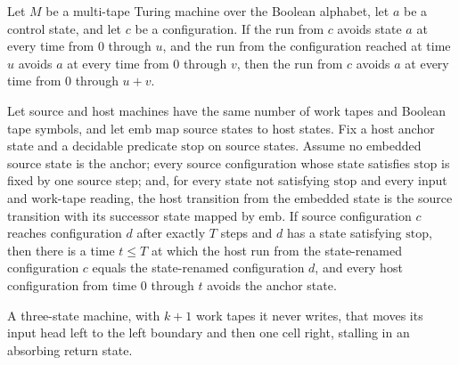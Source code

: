 \begin{lemma}
\label{Turing.FinTM.splitSafe_add}
\leanok
{}
Let $M$ be a multi-tape Turing machine over the Boolean alphabet, let $a$ be a control
state, and let $c$ be a configuration. If the run from $c$ avoids state $a$ at every
time from $0$ through $u$, and the run from the configuration reached at time $u$ avoids
$a$ at every time from $0$ through $v$, then the run from $c$ avoids $a$ at every time
from $0$ through $u+v$.
\end{lemma}

\begin{lemma}
\label{Turing.FinTM.splitEmbed_cut}
\leanok
{}
Let source and host machines have the same number of work tapes and Boolean tape
symbols, and let $\mathrm{emb}$ map source states to host states. Fix a host anchor
state and a decidable predicate $\mathrm{stop}$ on source states. Assume no embedded
source state is the anchor; every source configuration whose state satisfies
$\mathrm{stop}$ is fixed by one source step; and, for every state not satisfying
$\mathrm{stop}$ and every input and work-tape reading, the host transition from the
embedded state is the source transition with its successor state mapped by
$\mathrm{emb}$. If source configuration $c$ reaches configuration $d$ after exactly $T$
steps and $d$ has a state satisfying $\mathrm{stop}$, then there is a time $t\le T$ at
which the host run from the state-renamed configuration $c$ equals the state-renamed
configuration $d$, and every host configuration from time $0$ through $t$ avoids the
anchor state.
\end{lemma}

\begin{definition}
\label{Turing.FinTM.splitRewindTM}
\leanok
{}
A three-state machine, with $k+1$ work tapes it never writes, that moves its
input head left to the left boundary and then one cell right, stalling in an
absorbing return state.
\end{definition}

